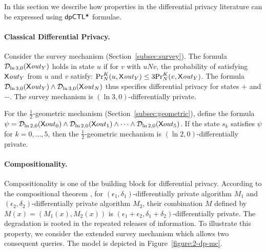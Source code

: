In this section we describe how properties in the differential privacy literature can be expressed using $\dpCTLstar$ formulae.

\paragraph{Classical Differential Privacy.}
Consider the survey mechanism (Section~\ref{subsec:survey}). The formula $\dpriv{\ln 3}{0} (\X \mathit{out}_Y)$ holds in state $u$ if for  $v$ with $u N v$, the probability of satisfying $\X \mathit{out}_Y$ from $u$ and $v$ satisfy:
$\myPr{u}{K}{N}{\X \mathit{out}_Y}\le 3\myPr{v}{K}{N}{\X \mathit{out}_Y}$. The formula $\dpriv{\ln 3}{0} (\X \mathit{out}_Y)\wedge \dpriv{\ln 3}{0} (\X \mathit{out}_N)$ thus specifies differential privacy for states $+$ and $-$.
The survey mechanism is $(\ln 3, 0)$-differentially private.



For the $\frac{1}{2}$-geometric mechanism (Section~\ref{subsec:geometric}),
define the formula
$\psi = \dpriv{\ln 2}{0} (\X out_0) \wedge \dpriv{\ln 2}{0} (\X out_1) \wedge
\cdots \wedge \dpriv{\ln 2}{0} (\X out_5)$. If the state $s_k$ satisfies
$\psi$ for $k = 0, \ldots, 5$, then the $\frac{1}{2}$-geometric mechanism is
$(\ln 2, 0)$-differentially private.


\paragraph{Compositionality.}
Compositionality is one of the building block for differential privacy. According to the compositional theorem \cite[Theorem 3.16]{DR:14:AFDP}, for $(\epsilon_1,\delta_1)$-differentially private algorithm $M_1$ and
$(\epsilon_2,\delta_2)$-differentially private algorithm $M_2$, their combination $M$ defined by $M(x)=(M_1(x), M_2(x))$ is $(\epsilon_1 + \epsilon_2,\delta_1+\delta_2)$-differentially private. The degradation is rooted in the repeated releases of information. To illustrate this property, we consider the extended survey mechanism which allows two consequent queries.
The model is depicted in Figure~\ref{figure:2-dp-mc}.

